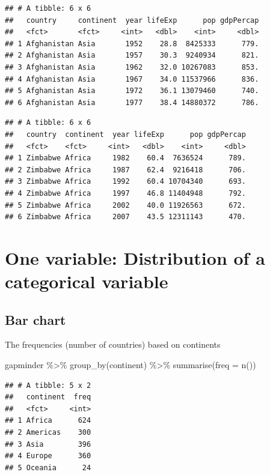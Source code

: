 \documentclass[
]{book}
\makeatletter
\newenvironment{Shaded}{\begin{snugshade}}{\end{snugshade}}
\newcommand{\AttributeTok}[1]{\textcolor[rgb]{0.61,0.61,0.61}{#1}}
\newcommand{\FunctionTok}[1]{\textcolor[rgb]{0,0,0}{#1}}
\newcommand{\NormalTok}[1]{#1}
\newcommand{\SpecialCharTok}[1]{\textcolor[rgb]{0,0,0}{#1}}
\newenvironment{kframe}{%
\medskip{}
\setlength{\fboxsep}{.8em}
 \def\at@end@of@kframe{}%
 \ifinner\ifhmode%
  \def\at@end@of@kframe{\end{minipage}}%
  \begin{minipage}{\columnwidth}%
 \fi\fi%
 \def\FrameCommand##1{\hskip\@totalleftmargin \hskip-\fboxsep
 \colorbox{shadecolor}{##1}\hskip-\fboxsep
     \hskip-\linewidth \hskip-\@totalleftmargin \hskip\columnwidth}%
 \MakeFramed {\advance\hsize-\width
   \@totalleftmargin\z@ \linewidth\hsize
   \@setminipage}}%
 {\par\unskip\endMakeFramed%
 \at@end@of@kframe}
\renewenvironment{Shaded}{\begin{kframe}}{\end{kframe}}
\makeatother
\begin{document}
\begin{verbatim}
## # A tibble: 6 x 6
##   country     continent  year lifeExp      pop gdpPercap
##   <fct>       <fct>     <int>   <dbl>    <int>     <dbl>
## 1 Afghanistan Asia       1952    28.8  8425333      779.
## 2 Afghanistan Asia       1957    30.3  9240934      821.
## 3 Afghanistan Asia       1962    32.0 10267083      853.
## 4 Afghanistan Asia       1967    34.0 11537966      836.
## 5 Afghanistan Asia       1972    36.1 13079460      740.
## 6 Afghanistan Asia       1977    38.4 14880372      786.
\end{verbatim}

\begin{verbatim}
## # A tibble: 6 x 6
##   country  continent  year lifeExp      pop gdpPercap
##   <fct>    <fct>     <int>   <dbl>    <int>     <dbl>
## 1 Zimbabwe Africa     1982    60.4  7636524      789.
## 2 Zimbabwe Africa     1987    62.4  9216418      706.
## 3 Zimbabwe Africa     1992    60.4 10704340      693.
## 4 Zimbabwe Africa     1997    46.8 11404948      792.
## 5 Zimbabwe Africa     2002    40.0 11926563      672.
## 6 Zimbabwe Africa     2007    43.5 12311143      470.
\end{verbatim}

\hypertarget{one-variable-distribution-of-a-categorical-variable}{%
\section{One variable: Distribution of a categorical variable}\label{one-variable-distribution-of-a-categorical-variable}}

\hypertarget{bar-chart}{%
\subsection{Bar chart}\label{bar-chart}}

The frequencies (number of countries) based on continents

\begin{Shaded}
\begin{Highlighting}[]
\NormalTok{gapminder }\SpecialCharTok{\%\textgreater{}\%} \FunctionTok{group\_by}\NormalTok{(continent) }\SpecialCharTok{\%\textgreater{}\%} \FunctionTok{summarise}\NormalTok{(}\AttributeTok{freq =} \FunctionTok{n}\NormalTok{())}
\end{Highlighting}
\end{Shaded}

\begin{verbatim}
## # A tibble: 5 x 2
##   continent  freq
##   <fct>     <int>
## 1 Africa      624
## 2 Americas    300
## 3 Asia        396
## 4 Europe      360
## 5 Oceania      24
\end{verbatim}
\end{document}
